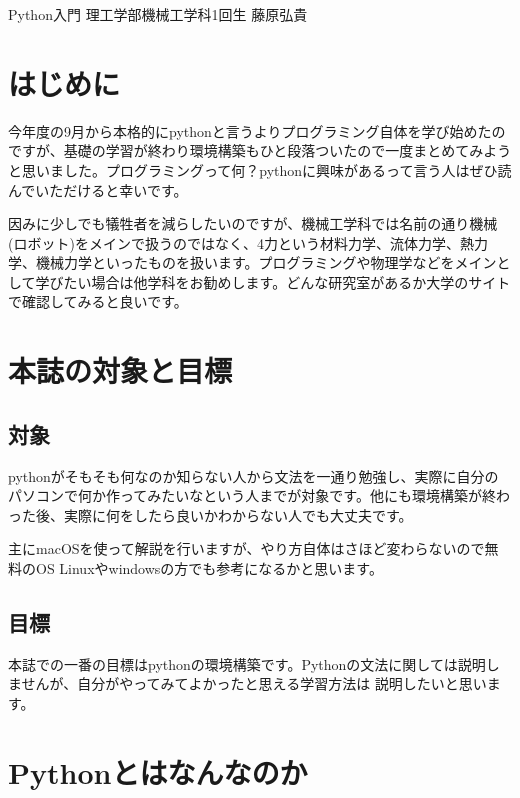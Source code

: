\documentclass[10pt,b5paper,papersize,dvipdfmx]{jsbook}
\begin{document}

\kaishititle%
  {Python入門}%
  {理工学部機械工学科1回生}%
  {藤原弘貴}%



%
\section*{はじめに}
今年度の9月から本格的にpythonと言うよりプログラミング自体を学び始めたのですが、基礎の学習が終わり環境構築もひと段落ついたので一度まとめてみようと思いました。プログラミングって何？pythonに興味があるって言う人はぜひ読んでいただけると幸いです。\par
因みに少しでも犠牲者を減らしたいのですが、機械工学科では名前の通り機械(ロボット)をメインで扱うのではなく、4力という材料力学、流体力学、熱力学、機械力学といったものを扱います。プログラミングや物理学などをメインとして学びたい場合は他学科をお勧めします。どんな研究室があるか大学のサイトで確認してみると良いです。\par
%
\clearpage

\section{本誌の対象と目標}
\subsection{対象}
pythonがそもそも何なのか知らない人から文法を一通り勉強し、実際に自分のパソコンで何か作ってみたいなという人までが対象です。他にも環境構築が終わった後、実際に何をしたら良いかわからない人でも大丈夫です。\par
主にmacOSを使って解説を行いますが、やり方自体はさほど変わらないので無料のOS Linuxやwindowsの方でも参考になるかと思います。\par
\subsection{目標}
本誌での一番の目標はpythonの環境構築です。Pythonの文法に関しては説明しませんが、自分がやってみてよかったと思える学習方法は
説明したいと思います。\par
\section{Pythonとはなんなのか}
\end{document}
